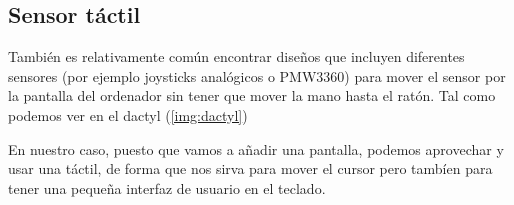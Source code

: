\subsection{Sensor táctil}
También es relativamente común encontrar diseños que incluyen diferentes sensores (por ejemplo joysticks analógicos o PMW3360) para mover el sensor por la pantalla del ordenador sin tener que mover la mano hasta el ratón. Tal como podemos ver en el dactyl (\ref{img:dactyl}) \par 
En nuestro caso, puesto que vamos a añadir una pantalla, podemos aprovechar y usar una táctil, de forma que nos sirva para mover el cursor pero tambíen para tener una pequeña interfaz de usuario en el teclado.